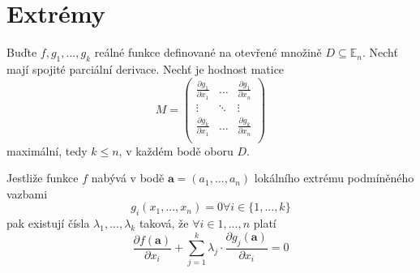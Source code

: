 \documentclass[../main.tex]{subfiles}
\begin{document}
\section{Extrémy}

\begin{theorem}
	Buďte $f,g_1, ... , g_k$ reálné funkce definované na otevřené množině $D \subseteq \mathbb{E}_n$.
	Nechť mají spojité parciální derivace. Nechť je hodnost matice
	\[ M = \begin{pmatrix}
	\frac{\partial g_1}{\partial x_1} & \dots & \frac{\partial g_1}{\partial x_n}\\
	\vdots & \ddots & \vdots\\
	\frac{\partial g_k}{\partial x_1} & \dots & \frac{\partial g_k}{\partial x_n}\\
	\end{pmatrix}\]
	maximální, tedy $k \leq n$, v každém bodě oboru $D$.

	Jestliže funkce $f$ nabývá v bodě $\mathbf{a} = (a_1, ... , a_n)$ lokálního extrému podmíněného vazbami
	\[ g_i(x_1, ... , x_n) = 0 \forall i \in \{ 1, ... , k \} \]
	pak existují čísla $\lambda _1, ... , \lambda _k$ taková, že $\forall i \in {1, ... , n}$ platí
	\[ \frac{\partial f(\mathbf{a})}{\partial x_i} +
	\sum_{j=1}^{k}\lambda_j \cdot \frac{\partial g_j(\mathbf{a})}{\partial x_i} = 0 \]
\end{theorem}
\end{document}
